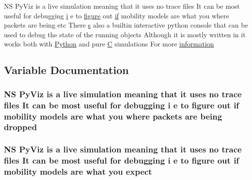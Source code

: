 \begin{DoxyCompactItemize}
\item 
NS Py\+Viz is a live simulation meaning that it uses no trace files It can be most useful for debugging \hyperlink{lte__uplink__power__control_8m_a6f6ccfcf58b31cb6412107d9d5281426}{i} e to \hyperlink{lte__ue__measurements_8m_a2332b9a4a4d6e4088c425e05a13e10f7}{figure} out \hyperlink{loss__OH__large__cities__urban_8m_ac77b6cfa3068152087725fe54b4ae8c8}{if} mobility models are what you where packets are being etc There \hyperlink{generate__test__data__lte__sinr_8m_ad83eeb3a142285d1243a08c6b7026df8}{s} also a builtin interactive python console that can be used to debug the state of the running objects Although it is mostly written in it works both with \hyperlink{doc_2readme_8txt_a5f34ac27f170e8e75dec4f484d4c44a3}{Python} and pure \hyperlink{loss__COST231__small__cities__urban_8m_aaa53ca0b650dfd85c4f59fa156f7a2cc}{C} simulations For more \hyperlink{doc_2readme_8txt_a56b8f954d58753a81bcf37ef0ad7ca0a}{information}
\end{DoxyCompactItemize}


\subsection{Variable Documentation}
\subsubsection[{\texorpdfstring{dropped}{dropped}}]{\setlength{\rightskip}{0pt plus 5cm}NS Py\+Viz is a live simulation meaning that it uses no trace files It can be most useful for debugging {\bf i} e to {\bf figure} out {\bf if} mobility models are what you where packets are being dropped}\hypertarget{doc_2readme_8txt_a78ec4502c469ce77ac5c1638424d0fc8}{}\label{doc_2readme_8txt_a78ec4502c469ce77ac5c1638424d0fc8}
\subsubsection[{\texorpdfstring{expect}{expect}}]{\setlength{\rightskip}{0pt plus 5cm}NS Py\+Viz is a live simulation meaning that it uses no trace files It can be most useful for debugging {\bf i} e to {\bf figure} out {\bf if} mobility models are what you expect}\hypertarget{doc_2readme_8txt_a11460adc33d00ccf94a559cdd45990ea}{}\label{doc_2readme_8txt_a11460adc33d00ccf94a559cdd45990ea}
